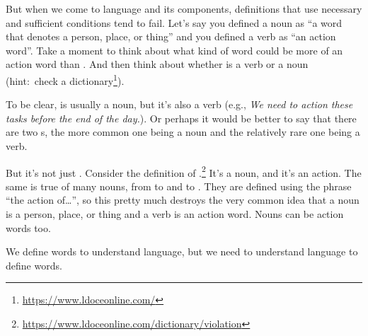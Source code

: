 But when we come to language and its components, definitions that use necessary and sufficient conditions tend to fail. Let's say you defined a noun as \enquote{a word that denotes a person, place, or thing} and you defined a verb as \enquote{an action word}. Take a moment to think about what kind of word could be more of an action word than . And then think about whether  is a verb or a noun (hint:~check a dictionary\footnote{\url{https://www.ldoceonline.com/}}).

To be clear,  is usually a noun, but it's also a verb (e.g., \textit{We need to \emph{action} these tasks before the end of the day.}). Or perhaps it would be better to say that there are two s, the more common one being a noun and the relatively rare one being a verb.

But it's not just . Consider the definition of .\footnote{\url{https://www.ldoceonline.com/dictionary/violation}} It's a noun, and it's an action. The same is true of many nouns, from  to  and  to . They are defined using the phrase \enquote{the action of\dots}, so this pretty much destroys the very common idea that a noun is a person, place, or thing and a verb is an action word. Nouns can be action words too.

We define words to understand language, but we need to understand language to define words.

